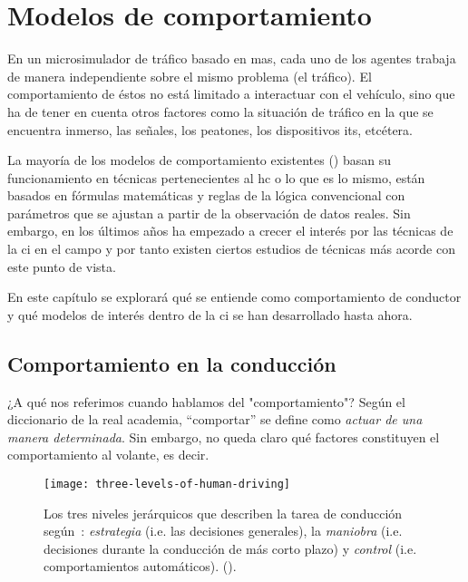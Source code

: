 \chapter{Modelos de comportamiento}
\label{ch:sota-behavior-models}

En un microsimulador de tráfico basado en \gls{mas}, cada uno de los agentes trabaja de manera independiente sobre el mismo problema (el tráfico). El comportamiento de éstos no está limitado a interactuar con el vehículo, sino que ha de tener en cuenta otros factores como la situación de tráfico en la que se encuentra inmerso, las señales, los peatones, los dispositivos \gls{its}, etcétera.

La mayoría de los modelos de comportamiento existentes () basan su funcionamiento en técnicas pertenecientes al \gls{hc} o lo que es lo mismo, están basados en fórmulas matemáticas y reglas de la lógica convencional con parámetros que se ajustan a partir de la observación de datos reales. Sin embargo, en los últimos años ha empezado a crecer el interés por las técnicas de la \gls{ci} en el campo y por tanto existen ciertos estudios de técnicas más acorde con este punto de vista.

En este capítulo se explorará qué se entiende como comportamiento de conductor y qué modelos de interés dentro de la \ac{ci} se han desarrollado hasta ahora.

\section{Comportamiento en la conducción}

¿A qué nos referimos cuando hablamos del "comportamiento"? Según el diccionario de la real academia, \enquote{comportar} se define como \textit{actuar de una manera determinada}. Sin embargo, no queda claro qué factores constituyen el comportamiento al volante, es decir.

\begin{figure}
	\centering
	\texttt{[image: three-levels-of-human-driving]}
	\caption{Los tres niveles jerárquicos que describen la tarea de conducción según~\cite{michon1985critical}: \textit{estrategia} (i.e. las decisiones generales), la \textit{maniobra} (i.e. decisiones durante la conducción de más corto plazo) y \textit{control} (i.e. comportamientos automáticos). ().}
	\label{fig:three-levels-of-human-driving}
\end{figure}

